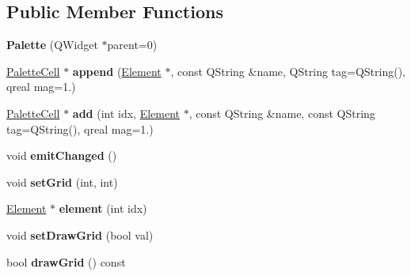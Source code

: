 \subsection*{Public Member Functions}
\begin{DoxyCompactItemize}
\item 
\mbox{\label{class_ms_1_1_palette_affe8f33976d4c66877fc8d7eb2121e7d}} 
{\bfseries Palette} (Q\+Widget $\ast$parent=0)
\item 
\mbox{\label{class_ms_1_1_palette_a53e88ad6f55373e457c0bcd2ddb3e866}} 
\hyperlink{struct_ms_1_1_palette_cell}{Palette\+Cell} $\ast$ {\bfseries append} (\hyperlink{class_ms_1_1_element}{Element} $\ast$, const Q\+String \&name, Q\+String tag=Q\+String(), qreal mag=1.)
\item 
\mbox{\label{class_ms_1_1_palette_ae6bfe8b7226fa1b1812b714b60470ee0}} 
\hyperlink{struct_ms_1_1_palette_cell}{Palette\+Cell} $\ast$ {\bfseries add} (int idx, \hyperlink{class_ms_1_1_element}{Element} $\ast$, const Q\+String \&name, const Q\+String tag=Q\+String(), qreal mag=1.)
\item 
\mbox{\label{class_ms_1_1_palette_a90990f006f8fb18242cb03c48b48a974}} 
void {\bfseries emit\+Changed} ()
\item 
\mbox{\label{class_ms_1_1_palette_a4c0a354249af95d5e6bdc8a75030ba92}} 
void {\bfseries set\+Grid} (int, int)
\item 
\mbox{\label{class_ms_1_1_palette_aafe19b70f71e3944f40b7e927ea3c53e}} 
\hyperlink{class_ms_1_1_element}{Element} $\ast$ {\bfseries element} (int idx)
\item 
\mbox{\label{class_ms_1_1_palette_a5a617fd9ca40e44f8eabf301b15e1c94}} 
void {\bfseries set\+Draw\+Grid} (bool val)
\item 
\mbox{\label{class_ms_1_1_palette_a2950f8227932580d6808754e49640777}} 
bool {\bfseries draw\+Grid} () const
\item 
\mbox{\label{class_ms_1_1_palette_a970d1797de313ccf3e7f01ab5917649b}} 

\end{DoxyCompactItemize}
